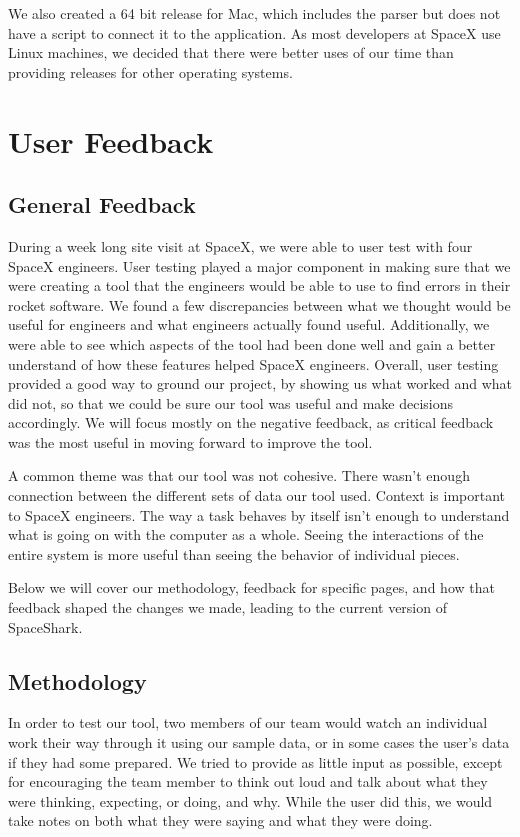\documentclass{hmcclinic}
\begin{document}
  We also created a 64 bit release for Mac, which includes the parser but does
  not have a script to connect it to the application. As most developers at
  SpaceX use Linux machines, we decided that there were better uses of our time
  than providing releases for other operating systems.


\chapter{User Feedback} %
\section{General Feedback} %
During a week long site visit at SpaceX, we were able to user test with four SpaceX engineers. 
User testing played a major component in making sure that we were creating a
tool that the engineers would be able to use to find errors in their rocket
software. We found a few discrepancies between what we thought would be useful
for engineers and what engineers actually found useful. Additionally, we were
able to see which aspects of the tool had been done well and gain a better
understand of how these features helped SpaceX engineers. Overall, user testing
provided a good way to ground our project, by showing us what worked and what
did not, so that we could be sure our tool was useful and make decisions
accordingly. We will focus mostly on the negative feedback, as critical feedback
was the most useful in moving forward to improve the tool.

A common theme was that our tool was not cohesive. There wasn't enough
connection between the different sets of data our tool used. Context is
important to SpaceX engineers. The way a task behaves by itself isn't
enough to understand what is going on with the computer as a whole. Seeing the
interactions of the entire system is more useful than seeing the behavior of individual pieces.

Below we will cover our methodology, feedback for specific pages, and how that
feedback shaped
the changes we made, leading to the current version of SpaceShark.

\section{Methodology} %
In order to test our tool, two members of our team would watch an individual
work their way through it using our sample data, or in some cases the user's
data if they had some prepared. We tried to provide as little
input as possible, except for encouraging the team member to think out loud and
talk about what they were thinking, expecting, or doing, and why. While the user
did this, we would take notes on both what they were saying and what they were
doing.
\end{document}

